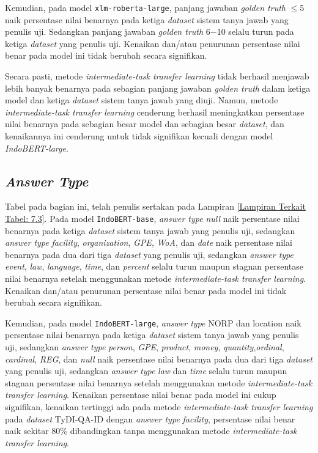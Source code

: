 Kemudian, pada model \texttt{xlm-roberta-large}, panjang jawaban \emph{golden truth} $\leq$5 naik persentase nilai benarnya pada ketiga \emph{dataset} sistem tanya jawab yang penulis uji. Sedangkan panjang jawaban \emph{golden truth} 6$-$10 selalu turun pada ketiga \emph{dataset} yang penulis uji. Kenaikan dan/atau penurunan persentase nilai benar pada model ini tidak berubah secara signifikan.

Secara pasti, metode \emph{intermediate-task transfer learning} tidak berhasil menjawab lebih banyak benarnya pada sebagian panjang jawaban \emph{golden truth} dalam ketiga model dan ketiga \emph{dataset} sistem tanya jawab yang diuji. Namun, metode \emph{intermediate-task transfer learning} cenderung berhasil meningkatkan persentase nilai benarnya pada sebagian besar model dan sebagian besar \emph{dataset}, dan kenaikannya ini cenderung untuk tidak signifikan kecuali dengan model \emph{IndoBERT-large}.

\subsection{\emph{Answer Type}}
Tabel pada bagian ini, telah penulis sertakan pada Lampiran \ref{Lampiran Terkait Tabel: 7.3}. Pada model \texttt{IndoBERT-base}, \emph{answer type} \emph{null} naik persentase nilai benarnya pada ketiga \emph{dataset} sistem tanya jawab yang penulis uji, sedangkan \emph{answer type} \emph{facility}, \emph{organization}, \emph{GPE}, \emph{WoA}, dan \emph{date} naik persentase nilai benarnya pada dua dari tiga \emph{dataset} yang penulis uji, sedangkan \emph{answer type} \emph{event}, \emph{law}, \emph{language}, \emph{time}, dan \emph{percent} selalu turun maupun stagnan persentase nilai benarnya setelah menggunakan metode \emph{intermediate-task transfer learning}. Kenaikan dan/atau penurunan persentase nilai benar pada model ini tidak berubah secara signifikan.

Kemudian, pada model \texttt{IndoBERT-large}, \emph{answer type} NORP dan location naik persentase nilai benarnya pada ketiga \emph{dataset} sistem tanya jawab yang penulis uji, sedangkan \emph{answer type} \emph{person}, \emph{GPE}, \emph{product}, \emph{money}, \emph{quantity},\emph{ordinal}, \emph{cardinal}, \emph{REG}, dan \emph{null} naik persentase nilai benarnya pada dua dari tiga \emph{dataset} yang penulis uji, sedangkan \emph{answer type} \emph{law} dan \emph{time} selalu turun maupun stagnan persentase nilai benarnya setelah menggunakan metode \emph{intermediate-task transfer learning}. Kenaikan persentase nilai benar pada model ini cukup signifikan, kenaikan tertinggi ada pada metode \emph{intermediate-task transfer learning} pada \emph{dataset} TyDI-QA-ID dengan \emph{answer type} \emph{facility}, persentase nilai benar naik sekitar 80\% dibandingkan tanpa menggunakan metode \emph{intermediate-task transfer learning}.

